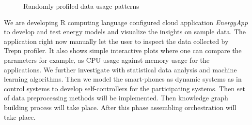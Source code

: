 \begin{figure}[h]
	\begin{center}
	\end{center}
	\caption{Randomly profiled data usage patterns}
	\label{fig:TrepnDataUsage}
\end{figure} 

We are developing R computing language configured cloud application \emph{EnergyApp} to develop and test energy models and visualize the insights on sample data. The application right now manually let the user to inspect the data collected by Trepn profiler. It also shows simple interactive plots where one can compare the parameters for example, as CPU usage against memory usage for the applications. We further investigate with statistical data analysis and machine learning algorithms. Then we model the smart-phones as dynamic systems as in control systems to develop self-controllers for the participating systems. Then set of data preprocessing methods will be implemented. Then knowledge graph building process will take place. After this phase assembling orchestration will take place. 









